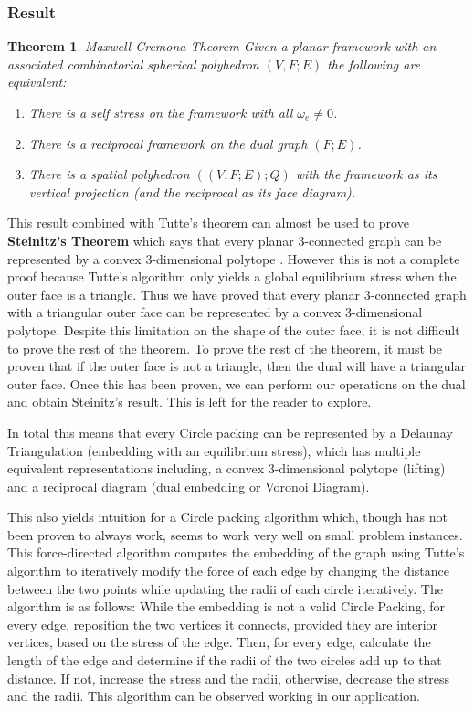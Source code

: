 \documentclass[11pt]{article}
\newtheorem{theorem}{Theorem}[section]
\theoremstyle{definition}
\begin{document}
\subsubsection{Result}

	\begin{theorem}{Maxwell-Cremona Theorem}
		Given a planar framework with an associated combinatorial spherical polyhedron $(V,F;E)$ the following are equivalent:
			\begin{enumerate}
				\item There is a self stress on the framework with all $\omega_e \neq 0$.
				\item There is a reciprocal framework on the dual graph $(F;E)$.
				\item There is a spatial polyhedron $((V,F;E);Q)$ with the framework as its vertical projection (and the reciprocal as its face diagram).
 			\end{enumerate}
 	\end{theorem}
	
	This result combined with Tutte's theorem can almost be used to prove \textbf{Steinitz's Theorem} which says that every planar 3-connected graph can be represented by a convex 3-dimensional polytope \cite{realizationSpaces}. 
	However this is not a complete proof because Tutte's algorithm only yields a global equilibrium stress when the outer face is a triangle. 
	Thus we have proved that every planar 3-connected graph with a triangular outer face can be represented by a convex 3-dimensional polytope. 
	Despite this limitation on the shape of the outer face, it is not difficult to prove the rest of the theorem. 
	To prove the rest of the theorem, it must be proven that if the outer face is not a triangle, then the dual will have a triangular outer face. 
	Once this has been proven, we can perform our operations on the dual and obtain Steinitz's result. 
	This is left for the reader to explore.
 
 	In total this means that every Circle packing can be represented by a Delaunay Triangulation (embedding with an equilibrium stress), which has multiple equivalent representations including, a convex 3-dimensional polytope (lifting) and a reciprocal diagram (dual embedding or Voronoi Diagram). 

	This also yields intuition for a Circle packing algorithm which, though has not been proven to always work, seems to work very well on small problem instances. 
	This force-directed algorithm computes the embedding of the graph using Tutte's algorithm to iteratively modify the force of each edge by changing the distance between the two points while updating the radii of each circle iteratively. 
	The algorithm is as follows: 
	While the embedding is not a valid Circle Packing, for every edge, reposition the two vertices it connects, provided they are interior vertices, based on the stress of the edge. 
	Then, for every edge, calculate the length of the edge and determine if the radii of the two circles add up to that distance. 
	If not, increase the stress and the radii, otherwise, decrease the stress and the radii. 
	This algorithm can be observed working in our application.
 
\end{document}
